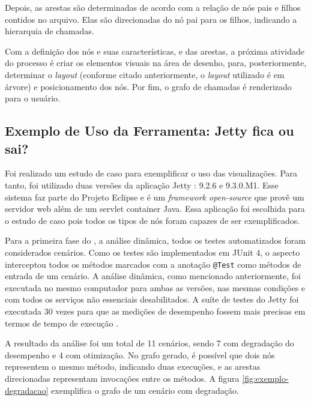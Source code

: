 Depois, as arestas são determinadas de acordo com a relação de nós pais e filhos contidos no arquivo. Elas são direcionadas do nó pai para os filhos, indicando a hierarquia de chamadas.

Com a definição dos nós e suas características, e das arestas, a próxima atividade do processo é criar os elementos visuais na área de desenho, para, posteriormente, determinar o \textit{layout} (conforme citado anteriormente, o \textit{layout} utilizado é em árvore) e posicionamento dos nós. Por fim, o grafo de chamadas é renderizado para o usuário.

\subsection{Exemplo de Uso da Ferramenta: Jetty {\color{red}fica ou sai?}} \label{subsec:exemplo-uso-jetty}

Foi realizado um estudo de caso para exemplificar o uso das visualizações. Para tanto, foi utilizado duas versões da aplicação Jetty \cite{Jetty2016}: 9.2.6 e 9.3.0.M1. Esse sistema faz parte do Projeto Eclipse e é um \textit{framework open-source} que provê um servidor web além de um servlet container Java. Essa aplicação foi escolhida para o estudo de caso pois todos os tipos de nós foram capazes de ser exemplificados.

Para a primeira fase do \textit{\perfMinerName}, a análise dinâmica, todos os testes automatizados foram considerados cenários. Como os testes são implementados em JUnit 4, o aspecto interceptou todos os métodos marcados com a anotação \texttt{@Test} como métodos de entrada de um cenário. A análise dinâmica, como mencionado anteriormente, foi executada no mesmo computador para ambas as versões, nas mesmas condições e com todos os serviços não essenciais desabilitados. A suíte de testes do Jetty foi executada 30 vezes para que as medições de desempenho fossem mais precisas em termos de tempo de execução \cite{Pinto2015}.

A resultado da análise foi um total de 11 cenários, sendo 7 com degradação do desempenho e 4 com otimização. No grafo gerado, é possível que dois nós representem o mesmo método, indicando duas execuções, e as arestas direcionadas representam invocações entre os métodos. A figura \ref{fig:exemplo-degradacao} exemplifica o grafo de um cenário com degradação.

